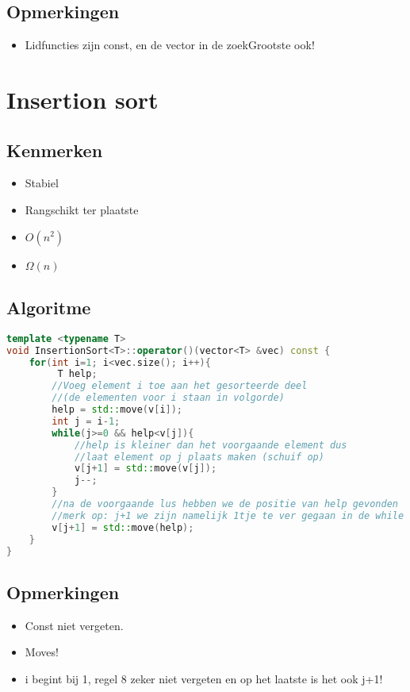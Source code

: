 \documentclass[a4paper]{article}
\begin{document}
\subsection*{Opmerkingen}
\begin{itemize}
	\item Lidfuncties zijn const, en de vector in de zoekGrootste ook!
\end{itemize}
\newpage

\section{Insertion sort}
\subsection*{Kenmerken}
\begin{itemize}
	\item Stabiel
	\item Rangschikt ter plaatste
	\item $O(n^2)$
	\item $\Omega(n)$
\end{itemize}

\subsection*{Algoritme}
\begin{lstlisting}[language=C++]
template <typename T>
void InsertionSort<T>::operator()(vector<T> &vec) const {
	for(int i=1; i<vec.size(); i++){
		 T help;
        //Voeg element i toe aan het gesorteerde deel 
        //(de elementen voor i staan in volgorde)
        help = std::move(v[i]);
        int j = i-1;
        while(j>=0 && help<v[j]){
            //help is kleiner dan het voorgaande element dus
            //laat element op j plaats maken (schuif op)
            v[j+1] = std::move(v[j]);
            j--;
        }
        //na de voorgaande lus hebben we de positie van help gevonden
        //merk op: j+1 we zijn namelijk 1tje te ver gegaan in de while lus
        v[j+1] = std::move(help);
	}
}
\end{lstlisting}

\subsection*{Opmerkingen}
\begin{itemize}
	\item Const niet vergeten.
	\item Moves!
	\item i begint bij 1, regel 8 zeker niet vergeten en op het laatste is het ook j+1!
\end{itemize}
\newpage
\end{document}
